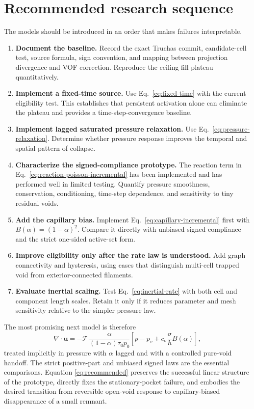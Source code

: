 \documentclass[11pt]{article}
\newcommand{\divg}{\nabla\!\cdot}
\newcommand{\uv}{\boldsymbol{u}}
\newcommand{\trapped}{\mathcal{T}}
\begin{document}
\section{Recommended research sequence}

The models should be introduced in an order that makes failures interpretable.

\begin{enumerate}
  \item \textbf{Document the baseline.}  Record the exact Truchas commit, candidate-cell
        test, source formula, sign convention, and mapping between projection divergence
        and VOF correction.  Reproduce the ceiling-fill plateau quantitatively.
  \item \textbf{Implement a fixed-time source.}  Use Eq.~\eqref{eq:fixed-time} with the
        current eligibility test.  This establishes that persistent activation alone can
        eliminate the plateau and provides a time-step-convergence baseline.
  \item \textbf{Implement lagged saturated pressure relaxation.}  Use
        Eq.~\eqref{eq:pressure-relaxation}.  Determine whether pressure response improves
        the temporal and spatial pattern of collapse.
  \item \textbf{Characterize the signed-compliance prototype.}  The reaction term in
        Eq.~\eqref{eq:reaction-poisson-incremental} has been implemented and has performed
        well in limited testing.  Quantify pressure smoothness, conservation,
        conditioning, time-step dependence, and sensitivity to tiny residual voids.
  \item \textbf{Add the capillary bias.}  Implement
        Eq.~\eqref{eq:capillary-incremental} first with
        \(B(\alpha)=(1-\alpha)^2\).  Compare it directly with unbiased signed compliance and the
        strict one-sided active-set form.
  \item \textbf{Improve eligibility only after the rate law is understood.}  Add graph
        connectivity and hysteresis, using cases that distinguish multi-cell trapped void
        from exterior-connected filaments.
  \item \textbf{Evaluate inertial scaling.}  Test Eq.~\eqref{eq:inertial-rate} with both
        cell and component length scales.  Retain it only if it reduces parameter and mesh
        sensitivity relative to the simpler pressure law.
\end{enumerate}

The most promising next model is therefore
\begin{equation}
  \boxed{
  \divg\uv=-
  \trapped\,
  \frac{\alpha}{(1-\alpha)\tau_0p_0}
  \left[p-p_v+c_\sigma\frac{\sigma}{h}B(\alpha)\right],}
  \label{eq:recommended}
\end{equation}
treated implicitly in pressure with \(\alpha\) lagged and with a controlled pure-void
handoff.  The strict positive-part and unbiased signed laws are the essential
comparisons.  Equation \eqref{eq:recommended} preserves the successful linear structure
of the prototype, directly fixes the stationary-pocket failure, and embodies the desired
transition from reversible open-void response to capillary-biased disappearance of a
small remnant.
\end{document}
